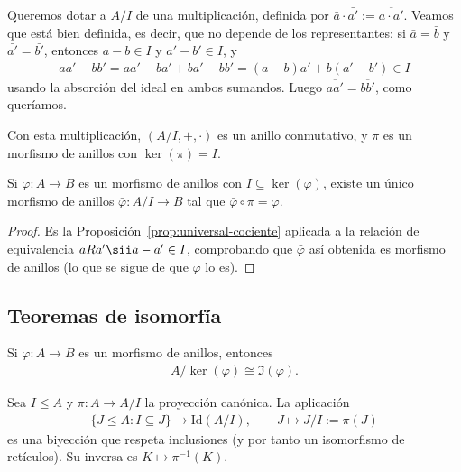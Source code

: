 Queremos dotar a $A/I$ de una multiplicación, definida por $\bar a \cdot \bar{a'} := \overline{a\cdot a'}$. Veamos que está bien definida, es decir, que no depende de los representantes: si $\bar a=\bar b$ y $\bar{a'}=\bar{b'}$, entonces $a-b\in I$ y $a'-b'\in I$, y
\begin{gather*}
    aa'-bb' = a a' - b a' + ba' - bb' = (a-b)a' + b(a'-b') \in I
\end{gather*}
usando la absorción del ideal en ambos sumandos. Luego $\overline{aa'}=\overline{bb'}$, como queríamos.

Con esta multiplicación, $(A/I,+,\cdot)$ es un anillo conmutativo, y $\pi$ es un morfismo de anillos con $\ker(\pi)=I$.

\begin{prop}
Si $\varphi:A\to B$ es un morfismo de anillos con $I\subseteq \ker(\varphi)$, existe un único morfismo de anillos $\bar\varphi: A/I \to B$ tal que $\bar\varphi \circ \pi = \varphi$.
\end{prop}
\begin{proof}
Es la Proposición~\ref{prop:universal-cociente} aplicada a la relación de equivalencia $aRa' \sii a-a'\in I$, comprobando que $\bar\varphi$ así obtenida es morfismo de anillos (lo que se sigue de que $\varphi$ lo es).
\end{proof}

\subsection{Teoremas de isomorfía}

\begin{teo}
Si $\varphi:A\to B$ es un morfismo de anillos, entonces
\begin{gather*}
    A/\ker(\varphi) \cong \Im(\varphi).
\end{gather*}
\end{teo}

\begin{teo}\label{teo:correspondencia}
Sea $I\leq A$ y $\pi:A\to A/I$ la proyección canónica. La aplicación
\begin{gather*}
    \{J\leq A : I\subseteq J\} \longrightarrow \mathrm{Id}(A/I), \qquad J \mapsto J/I:=\pi(J)
\end{gather*}
es una biyección que respeta inclusiones (y por tanto un isomorfismo de retículos). Su inversa es $K\mapsto \pi^{-1}(K)$.
\end{teo}

